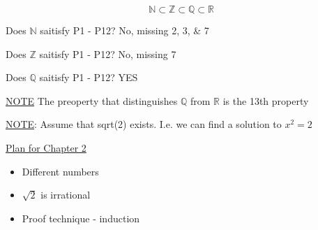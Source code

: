 \documentclass{report}
\begin{document}
    \[ \mathbb{N}   \subset \mathbb{Z} \subset \mathbb{Q} \subset \mathbb{R} \]

    Does $\mathbb{N}  $ saitisfy P1 - P12?  No, missing 2, 3, \& 7

    Does $\mathbb{Z}  $ saitisfy P1 - P12?  No, missing 7

    Does $\mathbb{Q}  $ saitisfy P1 - P12?  YES

    \underline{NOTE} The preoperty that distinguishes $\mathbb{Q} $ from
    $\mathbb{R}$ is the 13th property

    \underline{NOTE}:  Assume that sqrt(2) exists.  I.e. we can
    find a solution to $x^2 = 2$


    \underline{Plan for Chapter 2}
    \begin{itemize}
      \item Different numbers
      \item $\sqrt{2}$ is irrational
      \item Proof technique - induction
    \end{itemize}
\end{document}
